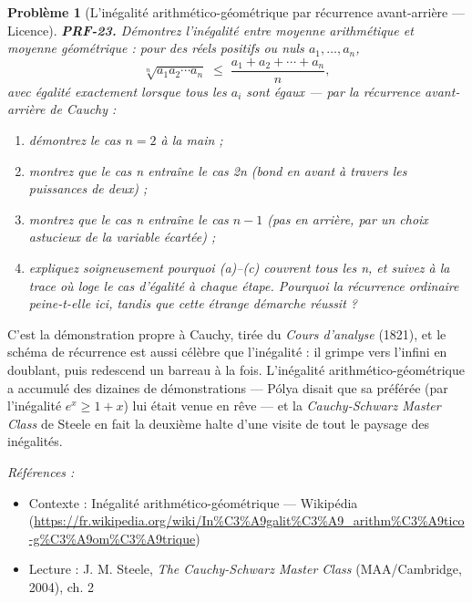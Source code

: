 \documentclass[11pt]{article}
\newtheorem{problem}{Problème}
\newenvironment{refs}{\par\small\noindent\emph{Références :}\begin{itemize}\setlength\itemsep{0pt}}{\end{itemize}\normalsize}
\begin{document}
\begin{problem}[{L'inégalité arithmético-géométrique par récurrence avant-arrière --- Licence}]
\textbf{PRF-23.} Démontrez l'inégalité entre moyenne arithmétique et moyenne
géométrique : pour des réels positifs ou nuls $ a_1, \dots, a_n $,
\[ \sqrt[n]{a_1 a_2 \cdots a_n} \;\le\; \frac{a_1 + a_2 + \cdots + a_n}{n}, \]
avec égalité exactement lorsque tous les $ a_i $ sont égaux --- par la récurrence
avant-arrière de Cauchy :
\begin{enumerate}
\item[(a)] démontrez le cas $ n = 2 $ à la main ;
\item[(b)] montrez que le cas n entraîne le cas
2n (bond en avant à travers les puissances de deux) ;
\item[(c)] montrez que le cas n entraîne le cas
$ n - 1 $ (pas en arrière, par un choix astucieux de la variable écartée) ;
\item[(d)] expliquez
soigneusement pourquoi (a)--(c) couvrent tous les n, et suivez à la trace où loge le cas
d'égalité à chaque étape. Pourquoi la récurrence ordinaire peine-t-elle ici, tandis que
cette étrange démarche réussit ?
\end{enumerate}

\end{problem}

\noindent C'est la démonstration propre à Cauchy, tirée du \textit{Cours d'analyse}
(1821), et le schéma de récurrence est aussi célèbre que l'inégalité : il grimpe vers
l'infini en doublant, puis redescend un barreau à la fois. L'inégalité
arithmético-géométrique a accumulé des dizaines de démonstrations --- Pólya disait que sa
préférée (par l'inégalité $ e^x \ge 1 + x $) lui était venue en rêve --- et la
\textit{Cauchy-Schwarz Master Class} de Steele en fait la deuxième halte d'une visite de tout
le paysage des inégalités.

\begin{refs}
\item Contexte : Inégalité arithmético-géométrique --- Wikipédia (\url{https://fr.wikipedia.org/wiki/In%C3%A9galit%C3%A9_arithm%C3%A9tico-g%C3%A9om%C3%A9trique})
\item Lecture : J. M. Steele, \textit{The Cauchy-Schwarz Master Class} (MAA/Cambridge, 2004), ch. 2
\end{refs}

\bigskip
\end{document}
